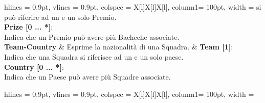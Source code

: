 \begin{tblr}{
    hlines = {0.9pt}, vlines = {0.9pt}, colspec = {X[l]X[l]X[l]}, column{1}= {100pt},
    width = \textwidth
}
{			si può riferire ad un e un solo Premio.\\
		\medskip\textbf{Prize [0 ... *]}:\\Indica che un Premio
			può avere più Bacheche associate.
	}
	\\
	{
		\textbf{Team-Country}
	}
	&
	{
		Esprime la nazionalità di una Squadra.
	}
	&
	{
		\textbf{Team [1]}:\\Indica che una Squadra si riferisce
			ad un e un solo paese.\\
		\medskip\textbf{Country [0 ... *]}:\\Indica che un Paese
			può avere più Squadre associate.
	}
	\\
\end{tblr}

\newpage

\begin{tblr}{
    hlines = {0.9pt}, vlines = {0.9pt}, colspec = {X[l]X[l]X[l]}, column{1}= {100pt},
    width = \textwidth
}


\end{tblr}
